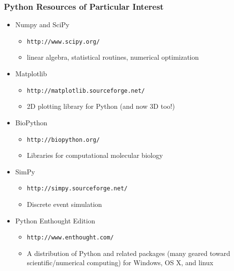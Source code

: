 \documentclass{beamer}
\begin{document}
\begin{frame}
  \frametitle{Python Resources of Particular Interest}
\begin{itemize}

\item Numpy and SciPy
\begin{itemize}
	\item \texttt{http://www.scipy.org/}
	\item linear algebra, statistical routines, numerical optimization
\end{itemize}

\item Matplotlib 
\begin{itemize}
	\item \texttt{http://matplotlib.sourceforge.net/}
	\item 2D plotting library for Python (and now 3D too!)
\end{itemize}

\item BioPython
\begin{itemize}
	\item \texttt{http://biopython.org/}
	\item Libraries for computational molecular biology
\end{itemize}

\item SimPy
\begin{itemize}
	\item \texttt{http://simpy.sourceforge.net/}
	\item Discrete event simulation
\end{itemize}

\item Python Enthought Edition
\begin{itemize}
	\item \texttt{http://www.enthought.com/}
	\item A distribution of Python and related packages (many geared toward scientific/numerical computing) for Windows, OS X, and linux
\end{itemize}

\end{itemize}

\end{frame}
\end{document}
